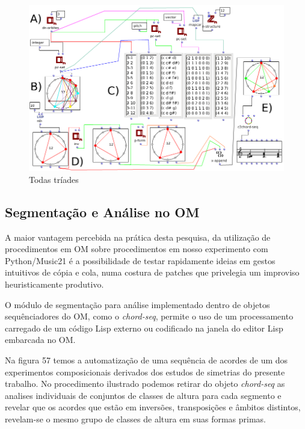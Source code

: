 \documentclass[
	12pt,				%
	openright,			%
	twoside,			%
	a4paper,			%
	english,			%
	french,				%
	spanish,			%
	brazil				%
	]{abntex2}
\begin{document}
\begin{figure}[!h]
	\caption{\label{fig_grafico}Todas tríades }
	\begin{center}
	    \includegraphics[scale=0.5]{OM_settheory/todas_triades.png}
	\end{center}
\end{figure}

\pagebreak
\subsection{Segmentação e Análise no OM}

A maior vantagem percebida na prática desta pesquisa, da utilização de procedimentos em OM sobre procedimentos em nosso experimento com Python/Music21 é a possibilidade de testar rapidamente ideias em gestos intuitivos de cópia e cola, numa costura de patches que privelegia um improviso heuristicamente produtivo. 

O módulo de segmentação para análise implementado dentro de objetos sequênciadores do OM, como o \textit{chord-seq}, permite o uso de um processamento carregado de um código Lisp externo ou codificado na janela do editor Lisp embarcada no OM. 

Na figura 57 temos a automatização de uma sequência de acordes de um dos experimentos composicionais derivados dos estudos de simetrias do presente trabalho. No procedimento ilustrado podemos retirar do objeto \textit{chord-seq} as analises individuais de conjuntos de classes de altura para cada segmento e revelar que os acordes que estão em inversões, transposições e âmbitos distintos, revelam-se o mesmo grupo de classes de altura em suas formas primas.
\end{document}
